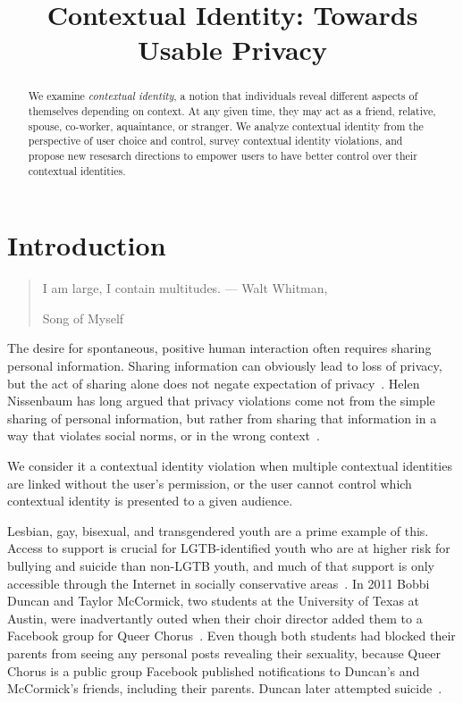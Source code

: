 \documentclass[10pt, conference, compsocconf]{IEEEtran}
\begin{document}
\title{Contextual Identity: Towards Usable Privacy}

\author{
}
\maketitle

\begin{abstract}
We examine \textit{contextual identity}, a notion that individuals reveal
different aspects of themselves depending on context. At any given time, they
may act as a friend, relative, spouse, co-worker, aquaintance, or stranger. We
analyze contextual identity from the perspective of user choice and control,
survey contextual identity violations, and propose new resesarch directions to
empower users to have better control over their contextual identities.
\end{abstract}

\section{Introduction}
\begin{quote}I am large, I contain multitudes. --- Walt Whitman,
\begin{em}Song of Myself\end{em} \end{quote}

The desire for spontaneous, positive human interaction often requires sharing
personal information. Sharing information can obviously lead to loss of
privacy, but the act of sharing alone does not negate expectation of
privacy~\cite{boyd2}.  Helen Nissenbaum has long argued that privacy violations
come not from the simple sharing of personal information, but rather from
sharing that information in a way that violates social norms, or in the wrong
context~\cite{nissenbaum}.

We consider it a contextual identity violation when
multiple contextual identities are linked without the user's permission, or the
user cannot control which contextual identity is presented to a given audience.

Lesbian, gay, bisexual, and transgendered youth are a prime example of this.
Access to support is crucial for LGTB-identified youth who are at higher risk
for bullying and suicide than non-LGTB youth, and much of that support is only
accessible through the Internet in socially conservative areas~\cite{hrc}. In
2011 Bobbi Duncan and Taylor McCormick, two students at the University of Texas
at Austin, were inadvertantly outed when their choir director added them to a
Facebook group for Queer Chorus~\cite{fowler}. Even though both students had
blocked their parents from seeing any personal posts revealing their sexuality,
because Queer Chorus is a public group Facebook published notifications to
Duncan's and McCormick's friends, including their parents. Duncan later
attempted suicide~\cite{duncan}.
\end{document}
